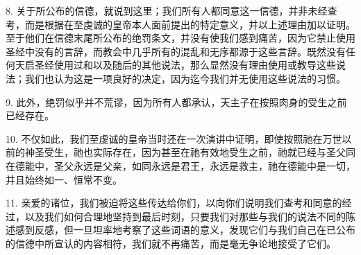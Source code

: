 8. 关于所公布的信德，就说到这里；我们所有人都同意这一信德，并非未经查考，而是根据在至虔诚的皇帝本人面前提出的特定意义，并以上述理由加以证明。至于他们在信德末尾所公布的绝罚条文，并没有使我们感到痛苦，因为它禁止使用圣经中没有的言辞，而教会中几乎所有的混乱和无序都源于这些言辞。既然没有任何天启圣经使用过和以及随后的其他说法，那么显然没有理由使用或教导这些说法；我们也认为这是一项良好的决定，因为迄今我们并无使用这些说法的习惯。\par

9. 此外，绝罚似乎并不荒谬，因为所有人都承认，天主子在按照肉身的受生之前已经存在。\par

10. 不仅如此，我们至虔诚的皇帝当时还在一次演讲中证明，即使按照祂在万世以前的神圣受生，祂也实际存在，因为甚至在祂有效地受生之前，祂就已经与圣父同在德能中，圣父永远是父亲，如同永远是君王，永远是救主，祂在德能中是一切，并且始终如一、恒常不变。\par

11. 亲爱的诸位，我们被迫将这些传达给你们，以向你们说明我们查考和同意的经过，以及我们如何合理地坚持到最后时刻，只要我们对那些与我们的说法不同的陈述感到反感，但一旦坦率地考察了这些词语的意义，发现它们与我们自己在已公布的信德中所宣认的内容相符，我们就不再痛苦，而是毫无争论地接受了它们。\par

